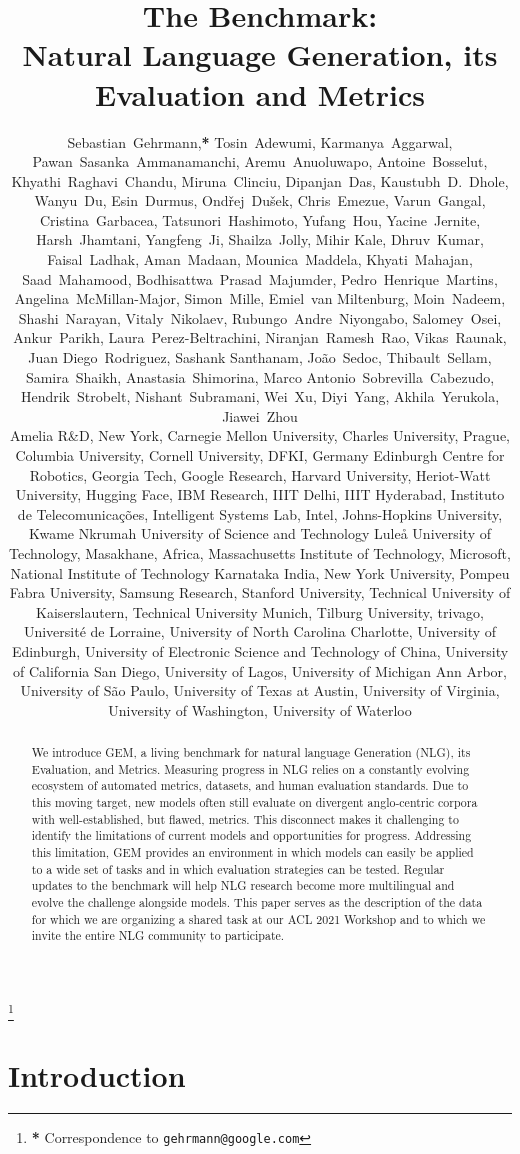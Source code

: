\documentclass[11pt,a4paper]{article}
\title{The\emojigem\GEM{} Benchmark: \\ Natural Language Generation, its Evaluation and Metrics}
\author{
\begin{minipage}[t]{\textwidth}
\centering
\normalsize
Sebastian~Gehrmann,\textbf{*}
Tosin~Adewumi,
Karmanya~Aggarwal,
Pawan~Sasanka~Ammanamanchi,
Aremu~Anuoluwapo,
Antoine~Bosselut,
Khyathi~Raghavi~Chandu,
Miruna~Clinciu,
Dipanjan~Das,
Kaustubh~D.~Dhole,
Wanyu~Du,
Esin~Durmus,
Ondřej~Dušek,
Chris~Emezue,
Varun~Gangal,
Cristina~Garbacea,
Tatsunori~Hashimoto,
Yufang~Hou,
Yacine~Jernite,
Harsh~Jhamtani,
Yangfeng~Ji,
Shailza~Jolly,
Mihir Kale,
Dhruv~Kumar,
Faisal~Ladhak,
Aman~Madaan,
Mounica~Maddela,
Khyati~Mahajan,
Saad~Mahamood,
Bodhisattwa~Prasad~Majumder,
Pedro~Henrique~Martins,
Angelina~McMillan-Major,
Simon~Mille,
Emiel~van Miltenburg,
Moin~Nadeem,
Shashi~Narayan,
Vitaly~Nikolaev,
Rubungo~Andre~Niyongabo,
Salomey~Osei,
Ankur~Parikh,
Laura~Perez-Beltrachini,
Niranjan~Ramesh~Rao,
Vikas~Raunak,
Juan Diego~Rodriguez,
Sashank Santhanam,
João~Sedoc,
Thibault~Sellam,
Samira~Shaikh,
Anastasia~Shimorina,
Marco Antonio~Sobrevilla~Cabezudo,
Hendrik~Strobelt,
Nishant~Subramani,
Wei~Xu,
Diyi~Yang,
Akhila~Yerukola,
Jiawei~Zhou \\

{\footnotesize \normalfont 
Amelia R\&D, New York,
Carnegie Mellon University,
Charles University, Prague,
Columbia University,
Cornell University,
DFKI, Germany
Edinburgh Centre for Robotics,
Georgia Tech,
Google Research,
Harvard University,
Heriot-Watt University,
Hugging Face,
IBM Research,
IIIT Delhi,
IIIT Hyderabad,
Instituto de Telecomunicações,
Intelligent Systems Lab, Intel,
Johns-Hopkins University,
Kwame Nkrumah University of Science and Technology
Luleå University of Technology,
Masakhane, Africa,
Massachusetts Institute of Technology,
Microsoft,
National Institute of Technology Karnataka India,
New York University,
Pompeu Fabra University,
Samsung Research,
Stanford University,
Technical University of Kaiserslautern,
Technical University Munich,
Tilburg University,
trivago,
Université de Lorraine,
University of North Carolina Charlotte,
University of Edinburgh,
University of Electronic Science and Technology of China,
University of California San Diego,
University of Lagos,
University of Michigan Ann Arbor,
University of São Paulo,
University of Texas at Austin,
University of Virginia,
University of Washington,
University of Waterloo
} 
\end{minipage}
}
\date{}
\newcommand\blfootnote[1]{\begingroup
  \renewcommand\thefootnote{}\footnote{#1}\addtocounter{footnote}{-1}\endgroup
}
\newcommand{\GEM}{\textsc{GEM}}
\begin{document}
\maketitle
\blfootnote{\textbf{*} Correspondence to \texttt{gehrmann@google.com}}
\begin{abstract}
    We introduce \GEM, a living benchmark for natural language Generation (NLG), its Evaluation, and Metrics. 
    Measuring progress in NLG relies on a constantly evolving ecosystem of automated metrics, datasets, and human evaluation standards. 
    Due to this moving target, new models often still evaluate on divergent anglo-centric corpora with well-established, but flawed, metrics. 
    This disconnect makes it challenging to identify the limitations of current models and opportunities for progress.
    Addressing this limitation, \GEM{} provides an environment in which models can easily be applied to a wide set of tasks and in which evaluation strategies can be tested. 
    Regular updates to the benchmark will help NLG research become more multilingual and evolve the challenge alongside models. 
    This paper serves as the description of the data for which we are organizing a shared task at our ACL 2021 Workshop and to which we invite the entire NLG community to participate. 
\end{abstract}


\section{Introduction}
\end{document}
